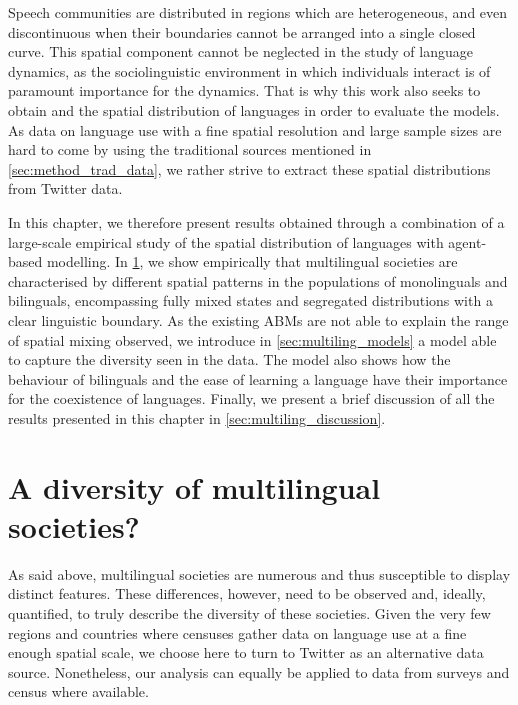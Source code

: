 \documentclass[../thesis.tex]{subfiles}
\begin{document}
Speech communities are distributed in regions which are heterogeneous, and even
discontinuous when their boundaries cannot be arranged into a single closed curve. This
spatial component cannot be neglected in the study of language dynamics, as the
sociolinguistic environment in which individuals interact is of paramount importance for
the dynamics. That is why this work also seeks to obtain and the spatial distribution of
languages in order to evaluate the models. As data on language use with a fine spatial
resolution and large sample sizes are hard to come by using the traditional sources
mentioned in \cref{sec:method_trad_data}, we rather strive to extract these spatial
distributions from Twitter data.

In this chapter, we therefore present results obtained through a combination of a
large-scale empirical study of the spatial distribution of languages with agent-based
modelling.
In \cref{sec:multiling_data}, we show empirically that multilingual societies
are characterised by different spatial patterns in the populations of monolinguals and
bilinguals, encompassing fully mixed states and segregated distributions with a clear
linguistic boundary. As the existing \acp{ABM} are not able to explain the range of
spatial mixing observed, we introduce in \cref{sec:multiling_models} a model able to
capture the diversity seen in the data. The model also shows how the behaviour of
bilinguals and the ease of learning a language have their importance for the coexistence
of languages. Finally, we present a brief discussion of all the results presented in
this chapter in \cref{sec:multiling_discussion}.



\section{A diversity of multilingual societies?}
\label{sec:multiling_data}
As said above, multilingual societies are numerous and thus susceptible to display
distinct features. These differences, however, need to be observed and, ideally,
quantified, to truly describe the diversity of these societies. Given the very few
regions and countries where censuses gather data on language use at a fine enough
spatial scale, we choose here to turn to Twitter as an alternative data source.
Nonetheless, our analysis can equally be applied to data from surveys and census where
available.
\end{document}
